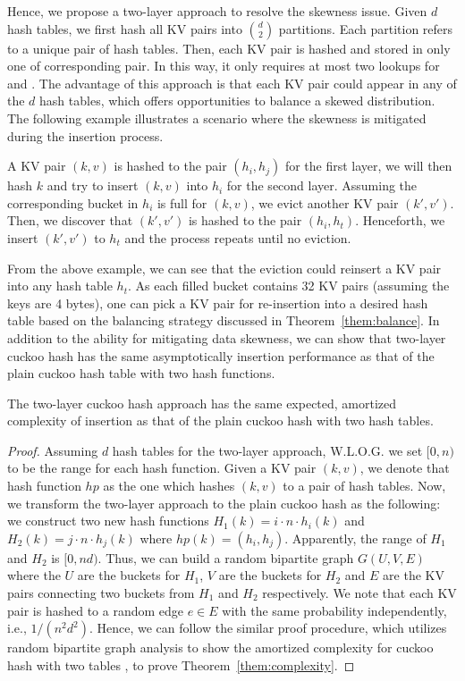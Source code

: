 Hence, we propose a two-layer approach to resolve the skewness issue. Given $d$ hash tables, we first hash all KV pairs into $\binom{d}{2}$ partitions. Each partition refers to a unique pair of hash tables. Then, each KV pair is hashed and stored in only one of corresponding pair. In this way, it only requires at most two lookups for  and . The advantage of this approach is that each KV pair could appear in any of the $d$ hash tables, which offers opportunities to balance a skewed distribution. The following example illustrates a scenario where the skewness is mitigated during the insertion process. 

\begin{example}
A KV pair $(k,v)$ is hashed to the pair $(h_i,h_j)$ for the first layer,  we will then hash $k$ and try to insert $(k,v)$ into $h_i$ for the second layer. Assuming the corresponding bucket in $h_i$ is full for $(k,v)$, we evict another KV pair $(k',v')$. Then, we discover that $(k',v')$ is hashed to the pair $(h_i,h_t)$. Henceforth, we insert $(k',v')$ to $h_t$ and the process repeats until no eviction.
\end{example}

From the above example, we can see that the eviction could reinsert a KV pair into any hash table $h_t$. As each filled bucket contains 32 KV pairs (assuming the keys are 4 bytes), one can pick a KV pair for re-insertion into a desired hash table based on the balancing strategy discussed in Theorem~\ref{them:balance}. In addition to the ability for mitigating data skewness, we can show that two-layer cuckoo hash has the same asymptotically insertion performance as that of the plain cuckoo hash table with two hash functions.  

\begin{theorem}\label{them:complexity}
The two-layer cuckoo hash approach has the same expected, amortized complexity of insertion as that of the plain cuckoo hash with two hash tables. 
\end{theorem}

\begin{proof}
Assuming $d$ hash tables for the two-layer approach, W.L.O.G. we set $[0,n)$ to be the range for each hash function. Given a KV pair $(k,v)$, we denote that hash function $hp$ as the one which hashes $(k,v)$ to a pair of hash tables.
Now, we transform the two-layer approach to the plain cuckoo hash as the following:
we construct two new hash functions $H_1(k) = i \cdot n \cdot h_i(k)$ and $H_2(k) = j \cdot n \cdot h_j(k)$ where $hp(k) = (h_i,h_j)$.
Apparently, the range of $H_1$ and $H_2$ is $[0,nd)$. Thus, we can build a random bipartite graph $G(U,V,E)$ where the $U$ are the buckets for $H_1$, $V$ are the buckets for $H_2$ and $E$ are the KV pairs connecting two buckets from $H_1$ and $H_2$ respectively. 
We note that each KV pair is hashed to a random edge $e \in E$ with the same probability independently, i.e., $1/(n^2d^2)$. Hence, we can follow the similar proof procedure, which utilizes random bipartite graph analysis to show the amortized complexity for cuckoo hash with two tables \cite{kutzelnigg:hal-01184689}, to prove Theorem~\ref{them:complexity}.
\end{proof}



